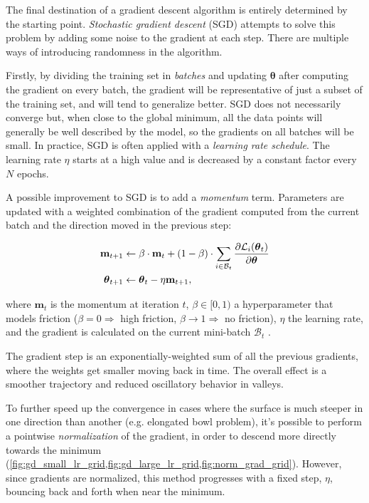 The final destination of a gradient descent algorithm is entirely determined by the starting point. \textit{Stochastic gradient descent} (SGD) attempts to solve this problem by adding some noise to the gradient at each step. There are multiple ways of introducing randomness in the algorithm.

Firstly, by dividing the training set in \textit{batches} and updating $\boldsymbol{\theta}$ after computing the gradient on every batch, the gradient will be representative of just a subset of the training set, and will tend to generalize better. SGD does not necessarily converge but, when close to the global minimum, all the data points will generally be well described by the model, so the gradients on all batches will be small. In practice, SGD is often applied with a \textit{learning rate schedule}. The learning rate $\eta$ starts at a high value and is decreased by a constant factor every $N$ epochs.

A possible improvement to SGD is to add a \textit{momentum} term. Parameters are updated with a weighted combination of the gradient computed from the current batch and the direction moved in the previous step:

\begin{align}
    \mathbf{m}_{t+1} &\leftarrow \beta \cdot \mathbf{m}_t + (1-\beta) \cdot \sum_{i \in \mathcal{B}_t} \frac{\partial \mathcal{L}_i(\boldsymbol{\theta}_t)}{\partial \boldsymbol{\theta}} \notag \\
    \boldsymbol{\theta}_{t+1} &\leftarrow \boldsymbol{\theta}_t - \eta \mathbf{m}_{t+1},
    \label{eq:momentum}
\end{align}

where $\mathbf{m}_t$ is the momentum at iteration $t$, $\beta \in [0,1)$ a hyperparameter that models friction ($\beta = 0 \Rightarrow$ high friction, $\beta \rightarrow 1 \Rightarrow$ no friction), $\eta$ the learning rate, and the gradient is calculated on the current mini-batch $\mathcal{B}_t$ \cite{geron2022hands, prince2023understanding}.

The gradient step is an exponentially-weighted sum of all the previous gradients, where the weights get smaller moving back in time. The overall effect is a smoother trajectory and reduced oscillatory behavior in valleys.

To further speed up the convergence in cases where the surface is much steeper in one direction than another (e.g. elongated bowl problem), it's possible to perform a pointwise \textit{normalization} of the gradient, in order to descend more directly towards the minimum (\cref{fig:gd_small_lr_grid,fig:gd_large_lr_grid,fig:norm_grad_grid}). However, since gradients are normalized, this method progresses with a fixed step, $\eta$, bouncing back and forth when near the minimum.

